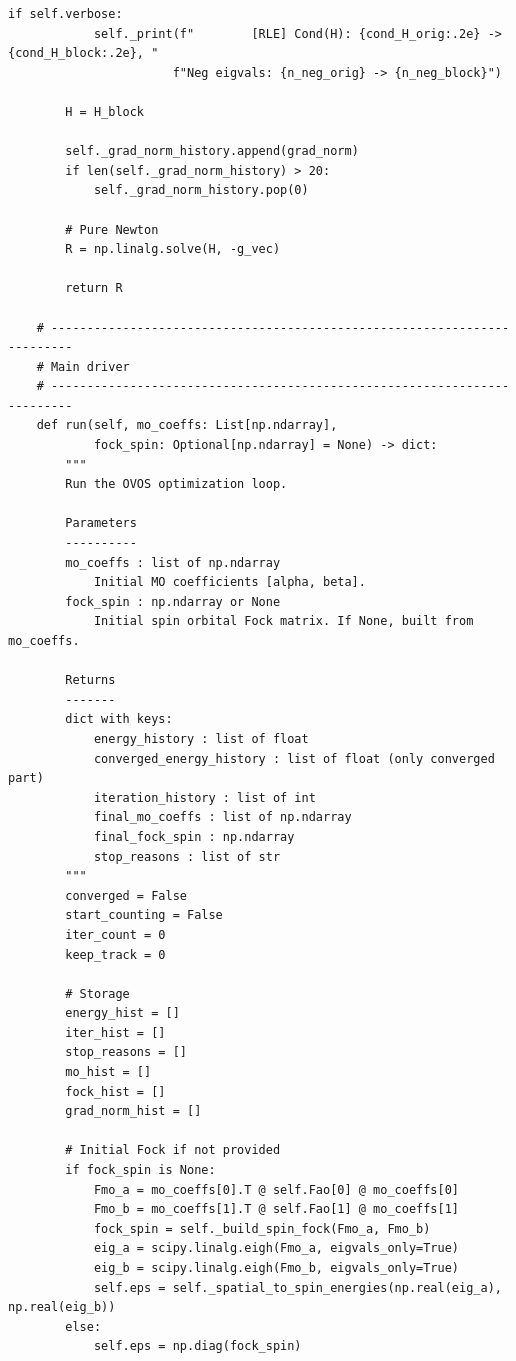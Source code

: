 \begin{lstlisting}[style=python, caption={...}, label=lst:full_code]
        if self.verbose:
            self._print(f"        [RLE] Cond(H): {cond_H_orig:.2e} -> {cond_H_block:.2e}, "
                       f"Neg eigvals: {n_neg_orig} -> {n_neg_block}")
        
        H = H_block
        
        self._grad_norm_history.append(grad_norm)
        if len(self._grad_norm_history) > 20:
            self._grad_norm_history.pop(0)

        # Pure Newton 
        R = np.linalg.solve(H, -g_vec)

        return R
                
    # -------------------------------------------------------------------------
    # Main driver
    # -------------------------------------------------------------------------
    def run(self, mo_coeffs: List[np.ndarray],
            fock_spin: Optional[np.ndarray] = None) -> dict:
        """
        Run the OVOS optimization loop.

        Parameters
        ----------
        mo_coeffs : list of np.ndarray
            Initial MO coefficients [alpha, beta].
        fock_spin : np.ndarray or None
            Initial spin orbital Fock matrix. If None, built from mo_coeffs.

        Returns
        -------
        dict with keys:
            energy_history : list of float
            converged_energy_history : list of float (only converged part)
            iteration_history : list of int
            final_mo_coeffs : list of np.ndarray
            final_fock_spin : np.ndarray
            stop_reasons : list of str
        """
        converged = False
        start_counting = False
        iter_count = 0
        keep_track = 0

        # Storage
        energy_hist = []
        iter_hist = []
        stop_reasons = []
        mo_hist = []
        fock_hist = []
        grad_norm_hist = []

        # Initial Fock if not provided
        if fock_spin is None:
            Fmo_a = mo_coeffs[0].T @ self.Fao[0] @ mo_coeffs[0]
            Fmo_b = mo_coeffs[1].T @ self.Fao[1] @ mo_coeffs[1]
            fock_spin = self._build_spin_fock(Fmo_a, Fmo_b)
            eig_a = scipy.linalg.eigh(Fmo_a, eigvals_only=True)
            eig_b = scipy.linalg.eigh(Fmo_b, eigvals_only=True)
            self.eps = self._spatial_to_spin_energies(np.real(eig_a), np.real(eig_b))
        else:
            self.eps = np.diag(fock_spin)


\end{lstlisting}
